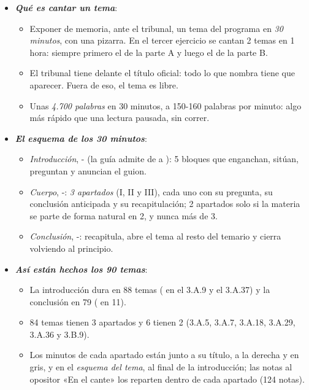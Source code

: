 \documentclass[11pt]{article}
\begin{document}
\begin{itemize}
\item \textbf{\emph{Qué es cantar un tema}}:
  \begin{itemize}
  \item Exponer de memoria, ante el tribunal, un tema del programa en \emph{30 minutos}, con una pizarra. En el tercer ejercicio se cantan 2 temas en 1 hora: siempre primero el de la parte A y luego el de la parte B.
  \item El tribunal tiene delante el título oficial: todo lo que nombra tiene que aparecer. Fuera de eso, el tema es libre.
  \item Unas \emph{4.700 palabras} en 30 minutos, a 150-160 palabras por minuto: algo más rápido que una lectura pausada, sin correr.
  \end{itemize}
\item \textbf{\emph{El esquema de los 30 minutos}}:
  \begin{itemize}
  \item \emph{Introducción}, - (la guía admite de  a ): 5 bloques que enganchan, sitúan, preguntan y anuncian el guion.
  \item \emph{Cuerpo}, -: \emph{3 apartados} (I, II y III), cada uno con su pregunta, su conclusión anticipada y su recapitulación; 2 apartados solo si la materia se parte de forma natural en 2, y nunca más de 3.
  \item \emph{Conclusión}, -: recapitula, abre el tema al resto del temario y cierra volviendo al principio.
  \end{itemize}
\item \textbf{\emph{Así están hechos los 90 temas}}:
  \begin{itemize}
  \item La introducción dura  en 88 temas ( en el 3.A.9 y el 3.A.37) y la conclusión  en 79 ( en 11).
  \item 84 temas tienen 3 apartados y 6 tienen 2 (3.A.5, 3.A.7, 3.A.18, 3.A.29, 3.A.36 y 3.B.9).
  \item Los minutos de cada apartado están junto a su título, a la derecha y en gris, y en el \emph{esquema del tema}, al final de la introducción; las notas al opositor «En el cante» los reparten dentro de cada apartado (124 notas).
  \end{itemize}
\end{itemize}
\end{document}
